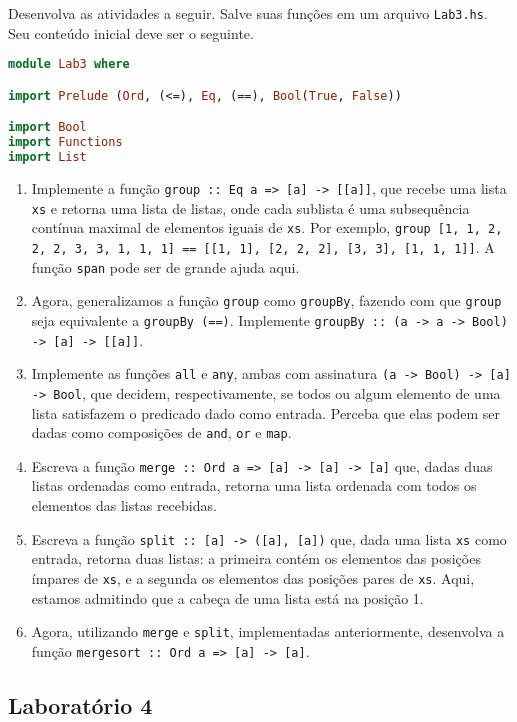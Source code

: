 \documentclass[a4paper]{article}
\begin{document}
Desenvolva as atividades a seguir.
Salve suas funções em um arquivo \texttt{Lab3.hs}.
Seu conteúdo inicial deve ser o seguinte.

\begin{lstlisting}[language=haskell, frame=single]
module Lab3 where

import Prelude (Ord, (<=), Eq, (==), Bool(True, False))

import Bool
import Functions
import List
\end{lstlisting}

\begin{enumerate}
	\item
		Implemente a função \texttt{group :: Eq a => [a] -> [[a]]}, que recebe uma lista \texttt{xs} e retorna uma lista de listas, onde cada sublista é uma subsequência contínua maximal de elementos iguais de \texttt{xs}.
		Por exemplo, \texttt{group [1, 1, 2, 2, 2, 3, 3, 1, 1, 1] == [[1, 1], [2, 2, 2], [3, 3], [1, 1, 1]]}.
		A função \texttt{span} pode ser de grande ajuda aqui.
	\item 
		Agora, generalizamos a função \texttt{group} como \texttt{groupBy}, fazendo com que \texttt{group} seja equivalente a \texttt{groupBy (==)}.
		Implemente \texttt{groupBy :: (a -> a -> Bool) -> [a] -> [[a]]}.
	\item
		Implemente as funções \texttt{all} e \texttt{any}, ambas com assinatura \texttt{(a -> Bool) -> [a] -> Bool}, que decidem, respectivamente, se todos ou algum elemento de uma lista satisfazem o predicado dado como entrada.
		Perceba que elas podem ser dadas como composições de \texttt{and}, \texttt{or} e \texttt{map}.
	\item
		Escreva a função \texttt{merge :: Ord a => [a] -> [a] -> [a]} que, dadas duas listas ordenadas como entrada, retorna uma lista ordenada com todos os elementos das listas recebidas.
	\item
		Escreva a função \texttt{split :: [a] -> ([a], [a])} que, dada uma lista \texttt{xs} como entrada, retorna duas listas: a primeira contém os elementos das posições ímpares de \texttt{xs}, e a segunda os elementos das posições pares de \texttt{xs}.
		Aqui, estamos admitindo que a cabeça de uma lista está na posição 1.
	\item
		Agora, utilizando \texttt{merge} e \texttt{split}, implementadas anteriormente, desenvolva a função \texttt{mergesort :: Ord a => [a] -> [a]}.
\end{enumerate}

\subsection{Laboratório 4}	\label{lab4}
\end{document}
